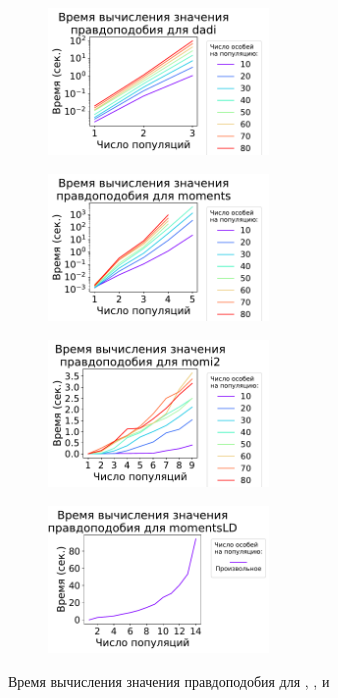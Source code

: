 \begin{figure}[t]
    \centering
    \begin{subfigure}[b]{.49\textwidth}
    \includegraphics[height=3.9cm]{images/part1/dem_history/complexity/dadi_rus.pdf}
    \caption{}
    \label{fig:part1:dem_inf:complexity:dadi}
    \end{subfigure}%
    \begin{subfigure}[b]{.49\textwidth}
    \includegraphics[height=3.9cm]{images/part1/dem_history/complexity/moments_rus.pdf}
    \caption{}
    \label{fig:part1:dem_inf:complexity:moments}
    \end{subfigure}
    \begin{subfigure}[b]{.49\textwidth}
    \includegraphics[height=3.9cm]{images/part1/dem_history/complexity/momi_rus.pdf}
    \caption{}
    \label{fig:part1:dem_inf:complexity:momi2}
    \end{subfigure}%
    \begin{subfigure}[b]{.49\textwidth}
    \includegraphics[height=3.9cm]{images/part1/dem_history/complexity/momentsLD_rus.pdf}
    \caption{}
    \label{fig:part1:dem_inf:complexity:momentsLD}
    \end{subfigure}
    \caption{Время вычисления значения правдоподобия для \dadi, \moments, \momentsLD и \momi}
    \label{fig:part1:dem_inf:complexity}
\end{figure}

